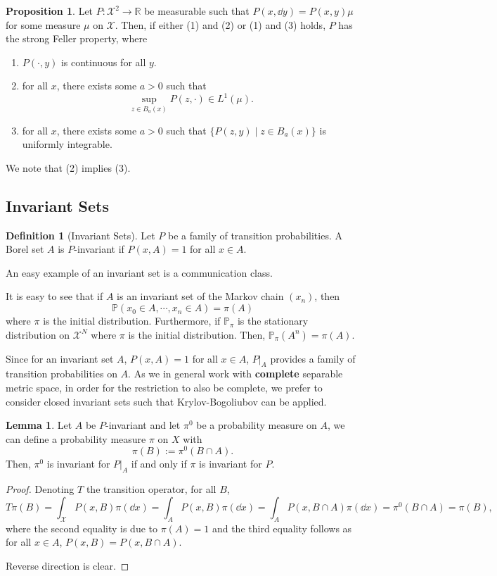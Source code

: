 \documentclass[]{article}
\theoremstyle{definition}
\theoremstyle{definition}
\newtheorem{definition}{Definition}[section]
\newtheorem{lemma}{Lemma}[section]
\newtheorem{proposition}{Proposition}[section]
\begin{document}
\begin{proposition}
  Let \(P : \mathcal{X}^2 \to \mathbb{R}\) be measurable such that 
  \(P(x, \dd y) = P(x, y)\mu\) for some measure \(\mu\) on \(\mathcal{X}\). 
  Then, if either (1) and (2) or (1) and (3) holds, \(P\) has the strong 
  Feller property, where 
  \begin{enumerate}
    \item \(P(\cdot, y)\) is continuous for all \(y\).
    \item for all \(x\), there exists some \(a > 0\) such that 
      \[\sup_{z \in B_a(x)} P(z, \cdot) \in L^1(\mu).\]
    \item for all \(x\), there exists some \(a > 0\) such that 
      \(\{P(z, y) \mid z \in B_a(x)\}\) is uniformly integrable.
  \end{enumerate}
  We note that (2) implies (3).
\end{proposition}

\subsection{Invariant Sets}

\begin{definition}[Invariant Sets]
  Let \(P\) be a family of transition probabilities. A Borel set \(A\) 
  is \(P\)-invariant if \(P(x, A) = 1\) for all \(x \in A\).
\end{definition}

An easy example of an invariant set is a communication class. 

It is easy to see that if \(A\) is an invariant set of the Markov chain 
\((x_n)\), then 
\[\mathbb{P}(x_0 \in A, \cdots, x_n \in A) = \pi(A)\]
where \(\pi\) is the initial distribution. Furthermore, if \(\mathbb{P}_\pi\) 
is the stationary distribution on \(\mathcal{X}^N\) where \(\pi\) is the 
initial distribution. Then, \(\mathbb{P}_\pi(A^n) = \pi(A)\).

Since for an invariant set \(A\), \(P(x, A) = 1\) for all \(x \in A\), 
\(P|_A\) provides a family of transition probabilities on \(A\). 
As we in general work with \textbf{complete} separable metric space, 
in order for the restriction to also be complete, we prefer to consider 
closed invariant sets such that Krylov-Bogoliubov can be applied.

\begin{lemma}
  Let \(A\) be \(P\)-invariant and let \(\pi^0\) be a probability measure 
  on \(A\), we can define a probability measure \(\pi\) on \(X\) with 
  \[\pi(B) := \pi^0(B \cap A).\]
  Then, \(\pi^0\) is invariant for \(P|_A\) if and only if \(\pi\) is invariant 
  for \(P\).
\end{lemma}
\begin{proof}
  Denoting \(T\) the transition operator, for all \(B\), 
  \[T\pi(B) = \int_{\mathcal{X}} P(x, B) \pi(\dd x) = 
    \int_A P(x, B) \pi(\dd x) = \int_A P(x, B \cap A) \pi(\dd x) 
    = \pi^0(B \cap A) = \pi(B),\]
  where the second equality is due to \(\pi(A) = 1\) and the third equality 
  follows as for all \(x \in A\), \(P(x, B) = P(x, B \cap A)\).

  Reverse direction is clear.
\end{proof}
\end{document}
